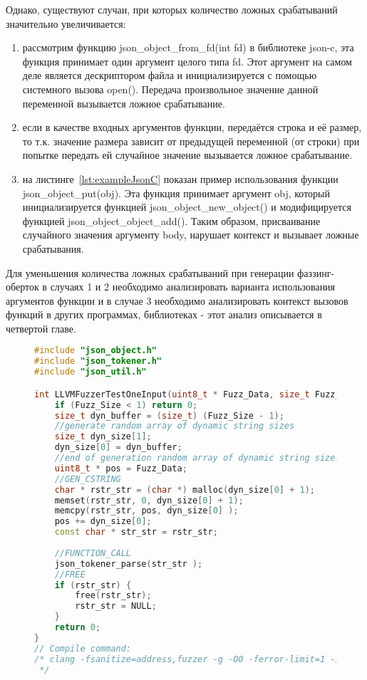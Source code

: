     Однако, существуют случаи, при которых количество ложных срабатываний значительно увеличивается:

\begin{enumerate}
    \item рассмотрим функцию json\_object\_from\_fd(int fd) в библиотеке json-c, эта функция принимает один аргумент целого типа fd. Этот аргумент на самом деле является дескриптором файла и инициализируется с помощью системного вызова open(). Передача произвольное значение данной переменной вызывается ложное срабатывание.
    \item если в качестве входных аргументов функции, передаётся строка и её размер, то т.к. значение размера зависит от предыдущей переменной (от строки) при попытке передать ей случайное значение вызывается ложное срабатывание.
    \item на листинге~\cref{lst:exampleJsonC} показан пример использования функции json\_object\_put(obj).  Эта функция принимает аргумент obj, который инициализируется функцией json\_object\_new\_object() и модифицируется функцией json\_object\_object\_add(). Таким образом, присваивание случайного значения аргументу body, нарушает контекст и вызывает ложные срабатывания.
\end{enumerate}

Для уменьшения количества ложных срабатываний при генерации фаззинг-оберток в случаях 1 и 2 необходимо анализировать варианта использования аргументов функции и в случае 3 необходимо анализировать контекст вызовов функций в других программах, библиотеках - этот анализ описывается в четвертой главе.

\begin{figure}[thp]
\begin{lstlisting}[language=C++,frame=single,caption={Результат метода генерации фаззинг-обертки в условиях отсутствия контекста использования},label=lst:wrapperNocontext]
#include "json_object.h"
#include "json_tokener.h"
#include "json_util.h"

int LLVMFuzzerTestOneInput(uint8_t * Fuzz_Data, size_t Fuzz_Size){
    if (Fuzz_Size < 1) return 0;
    size_t dyn_buffer = (size_t) (Fuzz_Size - 1);
    //generate random array of dynamic string sizes
    size_t dyn_size[1];
    dyn_size[0] = dyn_buffer;
    //end of generation random array of dynamic string sizes
    uint8_t * pos = Fuzz_Data;
    //GEN_CSTRING
    char * rstr_str = (char *) malloc(dyn_size[0] + 1);
    memset(rstr_str, 0, dyn_size[0] + 1);
    memcpy(rstr_str, pos, dyn_size[0] );
    pos += dyn_size[0];
    const char * str_str = rstr_str;
    
    //FUNCTION_CALL
    json_tokener_parse(str_str );
    //FREE
    if (rstr_str) {
        free(rstr_str);
        rstr_str = NULL;
    }
    return 0;
}
// Compile command:
/* clang -fsanitize=address,fuzzer -g -O0 -ferror-limit=1 -I. -I./.futag-build/  ./futag-drivers/json_tokener_parse1.c -o ./futag-drivers/json_tokener_parse1.out -Wl,--start-group ./.futag-build/libjson-c.a -Wl,--end-group 
 */
\end{lstlisting}
\end{figure}


